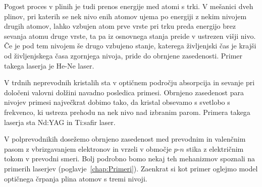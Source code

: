 Pogost proces v plinih je tudi prenos energije med atomi s trki. V
mešanici dveh plinov, pri katerih se nek nivo enih atomov ujema po energiji z
nekim nivojem drugih atomov, lahko vzbujen atom prve vrste pri trku preda 
energijo brez sevanja atomu druge vrste, ta pa iz osnovnega stanja preide v 
ustrezen višji nivo. Če je pod tem nivojem še drugo vzbujeno stanje, katerega
življenjski čas je krajši od življenjskega časa zgornjega nivoja, pride
do obrnjene zasedenosti. Primer takega laserja je He-Ne laser.

V trdnih neprevodnih kristalih sta v optičnem področju absorpcija
in sevanje pri določeni valovni dolžini navadno posledica primesi.
Obrnjeno zasedenost para nivojev primesi največkrat dobimo tako, da
kristal obsevamo s svetlobo s frekvenco, ki ustreza prehodu na nek
nivo nad izbranim parom. Primera takega laserja sta Nd:YAG in Ti:safir 
laser.  

V polprevodnikih dosežemo obrnjeno zasedenost med 
prevodnim in valenčnim pasom z vbrizgavanjem elektronov in vrzeli v območje $p$-$n$ 
stika z električnim tokom v prevodni smeri. Bolj podrobno bomo nekaj teh mehanizmov spoznali 
na primerih laserjev (poglavje~\ref{chap:Primeri}). Zaenkrat si kot primer oglejmo
model optičnega črpanja plina atomov s tremi nivoji.

